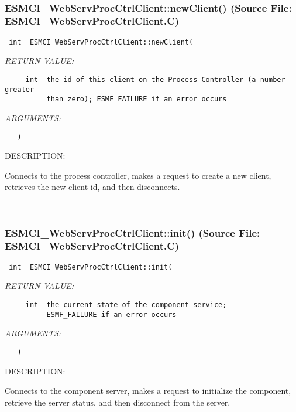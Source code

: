 \mbox{}\hrulefill\
 
\subsubsection{ESMCI\_WebServProcCtrlClient::newClient() (Source File: ESMCI\_WebServProcCtrlClient.C)}


  
\begin{verbatim} int  ESMCI_WebServProcCtrlClient::newClient(\end{verbatim}{\em RETURN VALUE:}
\begin{verbatim}     int  the id of this client on the Process Controller (a number greater
          than zero); ESMF_FAILURE if an error occurs\end{verbatim}{\em ARGUMENTS:}
\begin{verbatim}   )\end{verbatim}
{\sf DESCRIPTION:\\ }


      Connects to the process controller, makes a request to create a new
      client, retrieves the new client id, and then disconnects.
   
 
\mbox{}\hrulefill\
 
\subsubsection{ESMCI\_WebServProcCtrlClient::init() (Source File: ESMCI\_WebServProcCtrlClient.C)}


  
\begin{verbatim} int  ESMCI_WebServProcCtrlClient::init(\end{verbatim}{\em RETURN VALUE:}
\begin{verbatim}     int  the current state of the component service;
          ESMF_FAILURE if an error occurs\end{verbatim}{\em ARGUMENTS:}
\begin{verbatim}   )\end{verbatim}
{\sf DESCRIPTION:\\ }


      Connects to the component server, makes a request to initialize the
      component, retrieve the server status, and then disconnect from
      the server.
   
